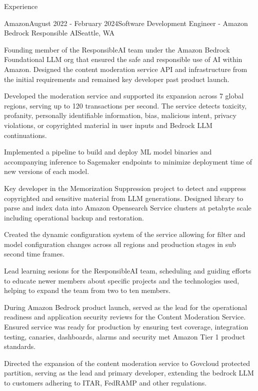 \documentclass{resume} %
\begin{document}
\begin{rSection}{Experience}
    \begin{rSubsection}{Amazon}{August 2022 - February 2024}{Software Development Engineer - Amazon Bedrock Responsible AI}{Seattle, WA}
      \item Founding member of the ResponsibleAI team under the Amazon Bedrock Foundational LLM org that ensured the safe and responsible use of AI within Amazon. 
    Designed the content moderation service API and infrastructure from the initial requirements and remained key developer past product launch.
      \item Developed the moderation service and supported its expansion across 7 global regions, serving up to 120 transactions per second. The service detects
    toxicity, profanity, personally identifiable information, bias, malicious intent, privacy violations, or copyrighted material in user inputs and Bedrock LLM continuations.
      \item Implemented a pipeline to build and deploy ML model binaries and accompanying inference to Sagemaker endpoints to minimize deployment time of new versions of each model.
      \item Key developer in the Memorization Suppression project to detect and suppress copyrighted and sensitive material from LLM generations. 
    Designed library to parse and index data into Amazon Opensearch Service clusters at petabyte scale including operational backup and restoration.
      \item Created the dynamic configuration system of the service allowing for filter and model configuration changes across all regions and production stages in sub second time frames.
      \item Lead learning sesions for the ResponsibleAI team, scheduling and guiding efforts to educate newer members about specific projects and the technologies used, helping to expand the team from two to ten members.
      \item During Amazon Bedrock product launch, served as the lead for the operational readiness and application security reviews for the Content Moderation Service. 
    Ensured service was ready for production by ensuring test coverage, integration testing, canaries, dashboards, alarms and security met Amazon Tier 1 product standards.
      \item Directed the expansion of the content moderation service to Govcloud protected partition, serving as the lead and primary developer, extending the bedrock LLM to customers adhering to ITAR, FedRAMP and other regulations.
    \end{rSubsection}
    

\end{rSection}
\end{document}
